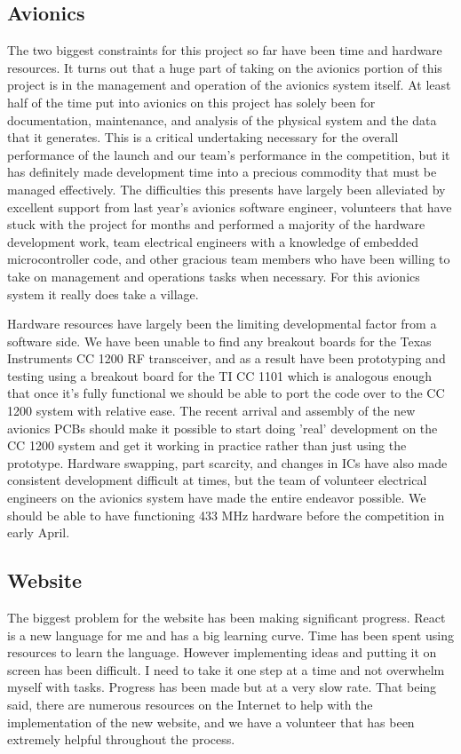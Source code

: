\documentclass[journal,10pt,draftclsnofoot,onecolumn,compsoc]{IEEEtran} \usepackage[margin=0.75in]{geometry}
\begin{document}
\subsection{Avionics}
The two biggest constraints for this project so far have been time and hardware resources. It turns out that a huge part of taking on the avionics portion of this project is in the management and operation of the avionics system itself. At least half of the time put into avionics on this project has solely been for documentation, maintenance, and analysis of the physical system and the data that it generates. This is a critical undertaking necessary for the overall performance of the launch and our team's performance in the competition, but it has definitely made development time into a precious commodity that must be managed effectively. The difficulties this presents have largely been alleviated by excellent support from last year's avionics software engineer, volunteers that have stuck with the project for months and performed a majority of the hardware development work, team electrical engineers with a knowledge of embedded microcontroller code, and other gracious team members who have been willing to take on management and operations tasks when necessary. For this avionics system it really does take a village. \newline

\noindent Hardware resources have largely been the limiting developmental factor from a software side. We have been unable to find any breakout boards for the Texas Instruments CC 1200 RF transceiver, and as a result have been prototyping and testing using a breakout board for the TI CC 1101 which is analogous enough that once it's fully functional we should be able to port the code over to the CC 1200 system with relative ease. The recent arrival and assembly of the new avionics PCBs should make it possible to start doing 'real' development on the CC 1200 system and get it working in practice rather than just using the prototype. Hardware swapping, part scarcity, and changes in ICs have also made consistent development difficult at times, but the team of volunteer electrical engineers on the avionics system have made the entire endeavor possible. We should be able to have functioning 433 MHz hardware before the competition in early April. 

\subsection{Website}
The biggest problem for the website has been making significant progress. React is a new language for me and has a big learning curve. Time has been spent using resources to learn the language. However implementing ideas and putting it on screen has been difficult. I need to take it one step at a time and not overwhelm myself with tasks. Progress has been made but at a very slow rate. That being said, there are numerous resources on the Internet to help with the implementation of the new website, and we have a volunteer that has been extremely helpful throughout the process. 
\end{document}
